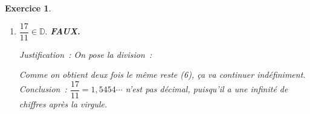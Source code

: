 \documentclass[10pt]{article}
\newtheorem{exo}{Exercice}
\begin{document}
\begin{exo}
\begin{enumerate}
Comme on obtient deux fois le même reste (4), ça va continuer indéfiniment. Conclusion~: $\dfrac{10}{6}=1,666\cdots$ n'est pas décimal, puisqu'il a une infinité de chiffres après la virgule.
\item $\dfrac{17}{11}\in\mathbb{D}.$ \textbf{FAUX.}

Justification~: On pose la division~:

\begin{center}
\end{center}

Comme on obtient deux fois le même reste (6), ça va continuer indéfiniment. Conclusion~: $\dfrac{17}{11}=1,5454\cdots$ n'est pas décimal, puisqu'il a une infinité de chiffres après la virgule.
\end{enumerate}

\end{exo}
\end{document}
